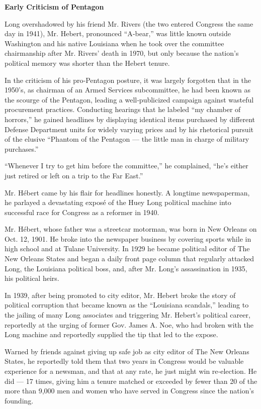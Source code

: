 \textbf{Early Criticism of Pentagon}

Long overshadowed by his friend Mr. Rivers (the two entered Congress the
same day in 1941), Mr. Hebert, pronounced ``A‐bear,'' was little known
outside Washington and his native Louisiana when he took over the
committee chairmanship after Mr. Rivers' death in 1970, but only because
the nation's political memory was shorter than the Hebert tenure.

In the criticism of his pro‐Pentagon posture, it was largely forgotten
that in the 1950's, as chairman of an Armed Services subcommittee, he
had been known as the scourge of the Pentagon, leading a well‐publicized
campaign against wasteful procurement practices. Conducting hearings
that he labeled ``my chamber of horrors,'' he gained headlines by
displaying identical items purchased by different Defense Department
units for widely varying prices and by his rhetorical pursuit of the
elusive ``Phantom of the Pentagon --- the little man in charge of
military purchases.''

``Whenever I try to get him before the committee,'' he complained,
``he's either just retired or left on a trip to the Far East.''

Mr. Hébert came by his flair for headlines honestly. A longtime
newspaperman, he parlayed a devastating exposé of the Huey Long
political machine into successful race for Congress as a reformer in
1940.

Mr. Hébert, whose father was a streetcar motorman, was born in New
Orleans on Oct. 12, 1901. He broke into the newspaper business by
covering sports while in high school and at Tulane University. In 1929
he became political editor of The New Orleans States and began a daily
front page column that regularly attacked Long, the Louisiana political
boss, and, after Mr. Long's assassination in 1935, his political heirs.

In 1939, after being promoted to city editor, Mr. Hebert broke the story
of political corruption that became known as the ``Louisiana scandals,''
leading to the jailing of many Long associates and triggering Mr.
Hebert's political career, reportedly at the urging of former Gov. James
A. Noe, who had broken with the Long machine and reportedly supplied the
tip that led to the expose.

Warned by friends against giving up safe job as city editor of The New
Orleans States, he reportedly told them that two years in Congress would
be valuable experience for a newsman, and that at any rate, he just
might win re‐election. He did --- 17 times, giving him a tenure matched
or exceeded by fewer than 20 of the more than 9,000 men and women who
have served in Congress since the nation's founding.

